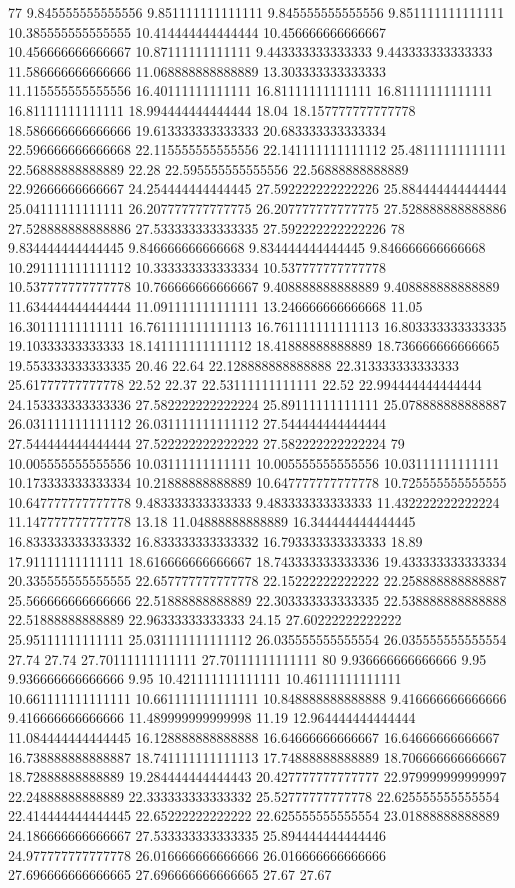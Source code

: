77 9.845555555555556 9.851111111111111 9.845555555555556 9.851111111111111 10.385555555555555 10.414444444444444 10.456666666666667 10.456666666666667 10.87111111111111 9.443333333333333 9.443333333333333 11.586666666666666 11.068888888888889 13.303333333333333 11.115555555555556 16.40111111111111 16.81111111111111 16.81111111111111 16.81111111111111 18.994444444444444 18.04 18.157777777777778 18.586666666666666 19.613333333333333 20.683333333333334 22.596666666666668 22.115555555555556 22.141111111111112 25.48111111111111 22.56888888888889 22.28 22.595555555555556 22.56888888888889 22.92666666666667 24.254444444444445 27.592222222222226 25.884444444444444 25.04111111111111 26.207777777777775 26.207777777777775 27.528888888888886 27.528888888888886 27.533333333333335 27.592222222222226
78 9.834444444444445 9.846666666666668 9.834444444444445 9.846666666666668 10.291111111111112 10.333333333333334 10.537777777777778 10.537777777777778 10.766666666666667 9.408888888888889 9.408888888888889 11.634444444444444 11.091111111111111 13.246666666666668 11.05 16.30111111111111 16.761111111111113 16.761111111111113 16.803333333333335 19.10333333333333 18.141111111111112 18.41888888888889 18.736666666666665 19.553333333333335 20.46 22.64 22.128888888888888 22.313333333333333 25.61777777777778 22.52 22.37 22.53111111111111 22.52 22.994444444444444 24.153333333333336 27.582222222222224 25.89111111111111 25.078888888888887 26.031111111111112 26.031111111111112 27.544444444444444 27.544444444444444 27.522222222222222 27.582222222222224
79 10.005555555555556 10.03111111111111 10.005555555555556 10.03111111111111 10.173333333333334 10.21888888888889 10.647777777777778 10.725555555555555 10.647777777777778 9.483333333333333 9.483333333333333 11.432222222222224 11.147777777777778 13.18 11.04888888888889 16.344444444444445 16.833333333333332 16.833333333333332 16.793333333333333 18.89 17.91111111111111 18.616666666666667 18.743333333333336 19.433333333333334 20.335555555555555 22.657777777777778 22.15222222222222 22.258888888888887 25.566666666666666 22.51888888888889 22.303333333333335 22.538888888888888 22.51888888888889 22.96333333333333 24.15 27.60222222222222 25.95111111111111 25.031111111111112 26.035555555555554 26.035555555555554 27.74 27.74 27.70111111111111 27.70111111111111
80 9.936666666666666 9.95 9.936666666666666 9.95 10.421111111111111 10.46111111111111 10.661111111111111 10.661111111111111 10.848888888888888 9.416666666666666 9.416666666666666 11.489999999999998 11.19 12.964444444444444 11.084444444444445 16.128888888888888 16.64666666666667 16.64666666666667 16.738888888888887 18.741111111111113 17.74888888888889 18.706666666666667 18.72888888888889 19.284444444444443 20.427777777777777 22.979999999999997 22.24888888888889 22.333333333333332 25.52777777777778 22.625555555555554 22.414444444444445 22.65222222222222 22.625555555555554 23.01888888888889 24.186666666666667 27.533333333333335 25.894444444444446 24.977777777777778 26.016666666666666 26.016666666666666 27.696666666666665 27.696666666666665 27.67 27.67
